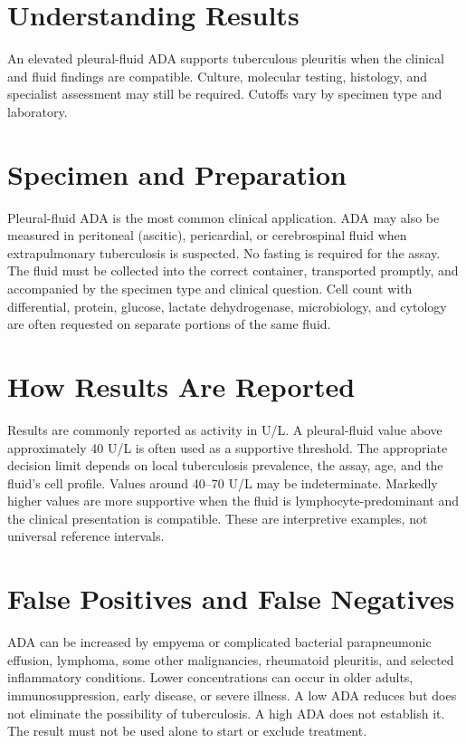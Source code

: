 \section*{Understanding Results}
An elevated pleural-fluid ADA supports tuberculous pleuritis when the clinical and fluid findings are compatible. Culture, molecular testing, histology, and specialist assessment may still be required. Cutoffs vary by specimen type and laboratory.

\section*{Specimen and Preparation}
Pleural-fluid ADA is the most common clinical application. ADA may also be measured in peritoneal (ascitic), pericardial, or cerebrospinal fluid when extrapulmonary tuberculosis is suspected. No fasting is required for the assay. The fluid must be collected into the correct container, transported promptly, and accompanied by the specimen type and clinical question. Cell count with differential, protein, glucose, lactate dehydrogenase, microbiology, and cytology are often requested on separate portions of the same fluid.

\section*{How Results Are Reported}
Results are commonly reported as activity in U/L. A pleural-fluid value above approximately 40 U/L is often used as a supportive threshold. The appropriate decision limit depends on local tuberculosis prevalence, the assay, age, and the fluid's cell profile. Values around 40--70 U/L may be indeterminate. Markedly higher values are more supportive when the fluid is lymphocyte-predominant and the clinical presentation is compatible. These are interpretive examples, not universal reference intervals.

\section*{False Positives and False Negatives}
ADA can be increased by empyema or complicated bacterial parapneumonic effusion, lymphoma, some other malignancies, rheumatoid pleuritis, and selected inflammatory conditions. Lower concentrations can occur in older adults, immunosuppression, early disease, or severe illness. A low ADA reduces but does not eliminate the possibility of tuberculosis. A high ADA does not establish it. The result must not be used alone to start or exclude treatment.

